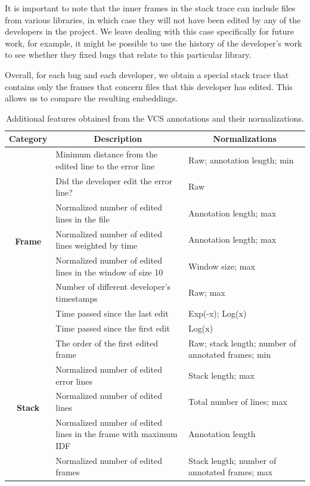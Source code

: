 It is important to note that the inner frames in the stack trace can include files from various libraries, in which case they will not have been edited by any of the developers in the project. We leave dealing with this case specifically for future work, for example, it might be possible to use the history of the developer's work to see whether they fixed bugs that relate to this particular library.

Overall, for each bug and each developer, we obtain a special stack trace that contains only the frames that concern files that this developer has edited. This allows us to compare the resulting embeddings.

\begin{table}
    \centering
    \caption{Additional features obtained from the VCS annotations and their normalizations.}
    \label{table:annot-features}
    \begin{tabular}{cll}
        \toprule
        \multicolumn{1}{c}{\textbf{Category}} & 
        \multicolumn{1}{c}{\textbf{Description}} & \multicolumn{1}{c}{\textbf{Normalizations}} \\ 
        \midrule
        \multirow{8}{4em}{\textbf{Frame}} 
        & 
        Minimum distance from the edited line to the error line & Raw; annotation length; min \\
        & 
        Did the developer edit the error line? & Raw  \\
        & 
        Normalized number of edited lines in the file & Annotation length; max \\
        & 
        Normalized number of edited lines weighted by time & Annotation length; max \\ 
        & 
        Normalized number of edited lines in the window of size 10 & Window size; max \\
        & 
        Number of different developer's timestamps & Raw; max \\
        &
        Time passed since the last edit & Exp(-x); Log(x) \\ 
        & 
        Time passed since the first edit & Log(x) \\
        \midrule
        \multirow{5}{4em}{\textbf{Stack}} 
        & 
        The order of the first edited frame & Raw; stack length; number of annotated frames; min \\
        & 
        Normalized number of edited error lines & Stack length; max \\
        & 
        Normalized number of edited lines & Total number of lines; max \\
        &  
        Normalized number of edited lines in the frame with maximum IDF & Annotation length \\
        & 
        Normalized number of edited frames & Stack length; number of annotated frames; max \\
        \bottomrule
    \end{tabular}
\end{table}

